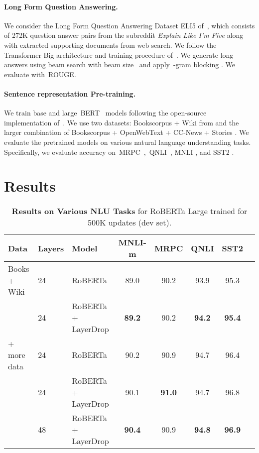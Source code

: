 \paragraph{Long Form Question Answering.}

We consider the Long Form Question Answering Dataset ELI5 of~\citet{fan2019eli5}, which consists of 272K question answer pairs from the subreddit \textit{Explain Like I'm Five} along with extracted supporting documents from web search.
We follow the Transformer Big architecture and training procedure of~\citet{fan2019eli5}. We generate long answers using beam search with beam size~ and apply~-gram blocking \citep{fan17controllable}.
We evaluate with~ROUGE.

\paragraph{Sentence representation Pre-training.}

We train base and large~BERT~\citep{devlin2018bert} models following the open-source implementation of~\citet{liu2019roberta}. We use two datasets: Bookscorpus + Wiki from \cite{liu2019roberta} and the larger combination of Bookscorpus + OpenWebText + CC-News + Stories \citep{liu2019roberta}. We evaluate the pretrained models on various natural language understanding tasks.
Specifically, we evaluate accuracy on~MRPC~\citep{dolan2005automatically},~QNLI~\citep{rajpurkar2016squad}, MNLI \citep{williams2018broad}, and SST2 \citep{socher2013recursive}.

\section{Results}


\begin{table}
\centering
\begin{tabular}{lllccccc}
\toprule
Data & Layers & Model  &  MNLI-m & MRPC & QNLI & SST2 \\
\midrule
Books + Wiki & 24 & RoBERTa             &  89.0    & 90.2 & 93.9     & 95.3 \\
 & 24 & RoBERTa + LayerDrop & \bf 89.2 & 90.2 & \bf 94.2 & \bf 95.4 \\
\midrule
+ more data & 24 & RoBERTa             & 90.2 & 90.9 & 94.7 & 96.4 \\
 & 24 & RoBERTa + LayerDrop &  90.1 & \bf 91.0 & 94.7 &  96.8 \\
 & 48\footnotemark & RoBERTa + LayerDrop & \bf 90.4 & 90.9 &  \bf 94.8 &  \bf 96.9\\
\bottomrule
\end{tabular}
\caption{
\textbf{Results on Various NLU Tasks} for RoBERTa Large trained for 500K updates (dev set).}
\label{tab:bert_regularization}
\end{table}

